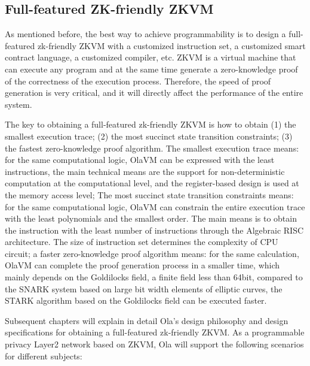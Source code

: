 \subsection{Full-featured ZK-friendly ZKVM}

As mentioned before, the best way to achieve programmability is to design a full-featured zk-friendly ZKVM with a customized instruction set, a customized smart contract language, a customized compiler, etc. 
ZKVM is a virtual machine that can execute any program and at the same time generate a zero-knowledge proof of the correctness of the execution process. Therefore, the speed of proof generation 
is very critical, and it will directly affect the performance of the entire system.

The key to obtaining a full-featured zk-friendly ZKVM is how to obtain (1) the smallest execution trace; (2) the most succinct state transition constraints; (3) the fastest 
zero-knowledge proof algorithm. The smallest execution trace means: for the same computational logic, OlaVM \cite{website:OlaVM} can be expressed with the least instructions, the main technical means are the 
support for non-deterministic computation at the computational level, and the register-based design is used at the memory access level; The most succinct state transition constraints means: 
for the same computational logic, OlaVM can constrain the entire execution trace with the least polynomials and the smallest order. The main means is to obtain the instruction with the least 
number of instructions through the Algebraic RISC architecture. The size of instruction set determines the complexity of CPU circuit; a faster zero-knowledge proof algorithm 
means: for the same calculation, OlaVM can complete the proof generation process in a smaller time, which mainly depends on the Goldilocks \cite{website:Goldilocks} field, a finite field less than 64bit, compared to the 
SNARK system based on large bit width elements of elliptic curves, the STARK algorithm based on the Goldilocks \cite{website:Goldilocks} field can be executed faster.

Subsequent chapters will explain in detail Ola's design philosophy and design specifications for obtaining a full-featured zk-friendly ZKVM. As a programmable privacy Layer2 network 
based on ZKVM, Ola will support the following scenarios for different subjects:

